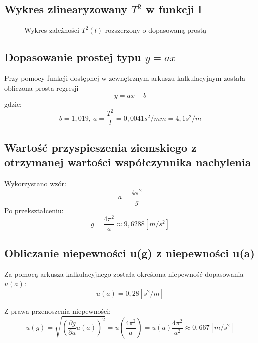 \documentclass[18pt, twoside]{article}
\begin{document}
	
	
	\subsection{Wykres zlinearyzowany \(T^2\) w funkcji l}


	\begin{figure}[h!]
		\caption{Wykres zależności \(T^2(l)\) rozszerzony o dopasowaną prostą}
	\end{figure}
	\subsection{Dopasowanie prostej typu \(y = ax\)}
	Przy pomocy funkcji dostępnej w zewnętrznym arkuszu kalkulacyjnym została obliczona prosta regresji \[y=ax+b\]
	gdzie: \[b = 1,019 ,\: a = \frac{T^2}{l} = 0,0041 s^2/mm = 4,1 s^2/m\]
	\subsection{Wartość przyspieszenia 
	ziemskiego z otrzymanej wartości współczynnika nachylenia}
	Wykorzystano wzór:
	\[a = \frac{4\pi^2}{g}\]
	Po przekształceniu:
	\[g = \frac{4\pi^2}{a} \approx 9,6288 [m/s^2]\]
		
		
	\subsection{Obliczanie niepewności u(g) z niepewności u(a) }
	Za pomocą arkusza kalkulacyjnego została określona niepewność dopasowania \(u(a)\):
	\[u(a)=0,28 [s^2/m]\]
		
	Z prawa przenoszenia niepewności:
	\[u(g)=\sqrt{(\frac{\partial g}{\partial a} u(a))^2}=u(\frac{4\pi^2}{a})=u(a)\frac{4\pi^2}{a^2}\approx 0,667 [{m}/{s^2}]\]
	
\end{document}

